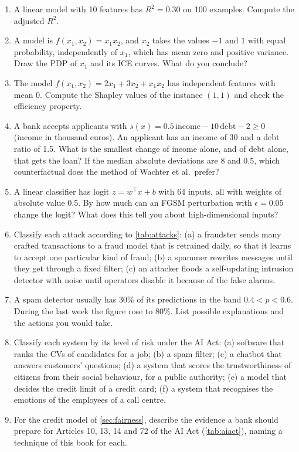 \begin{enumerate}[label=\textbf{3.\arabic*},ref=3.\arabic*,leftmargin=*,itemsep=6pt]
        more year of education?
  \item\label{exr3:adjr2} A linear model with 10 features has $R^2=0.30$ on 100 examples. Compute the
        adjusted $R^2$.
  \item\label{exr3:pdp} A model is $f(x_1,x_2)=x_1x_2$, and $x_2$ takes the values $-1$ and $1$ with equal
        probability, independently of $x_1$, which has mean zero and positive variance. Draw the PDP of $x_1$ and its ICE curves. What do you
        conclude?
  \item\label{exr3:shapley} The model $f(x_1,x_2)=2x_1+3x_2+x_1x_2$ has independent features with mean 0.
        Compute the Shapley values of the instance $(1,1)$ and check the efficiency property.
  \item\label{exr3:cf} A bank accepts applicants with $s(x)=0.5\,\text{income}-10\,\text{debt}-2\geq0$
        (income in thousand euros). An applicant has an income of 30 and a debt ratio of 1.5. What is the
        smallest change of income alone, and of debt alone, that gets the loan? If the median absolute
        deviations are 8 and 0.5, which counterfactual does the method of Wachter et al.\ prefer?
  \item\label{exr3:fgsm} A linear classifier has logit $z=w^\top x+b$ with 64 inputs, all with weights of
        absolute value 0.5. By how much can an FGSM perturbation with $\epsilon=0.05$ change the logit? What
        does this tell you about high-dimensional inputs?
  \item\label{exr3:taxonomy} Classify each attack according to \cref{tab:attacks}: (a) a fraudster sends
        many crafted transactions to a fraud model that is retrained daily, so that it learns to accept
        one particular kind of fraud; (b) a spammer rewrites messages until they get through a fixed
        filter; (c) an attacker floods a self-updating intrusion detector with noise until operators
        disable it because of the false alarms.
  \item\label{exr3:monitor} A spam detector usually has 30\% of its predictions in the band
        $0.4<p<0.6$. During the last week the figure rose to 80\%. List possible explanations and the
        actions you would take.
  \item\label{exr3:aiacttiers} Classify each system by its level of risk under the AI Act: (a) software that ranks the CVs of
        candidates for a job; (b) a spam filter; (c) a chatbot that answers customers' questions; (d) a system that scores the
        trustworthiness of citizens from their social behaviour, for a public authority; (e) a model that decides the credit
        limit of a credit card; (f) a system that recognises the emotions of the employees of a call centre.
  \item\label{exr3:aiactplan} For the credit model of \cref{sec:fairness}, describe the evidence a bank should prepare for
        Articles 10, 13, 14 and 72 of the AI Act (\cref{tab:aiact}), naming a technique of this book for each.
\end{enumerate}

